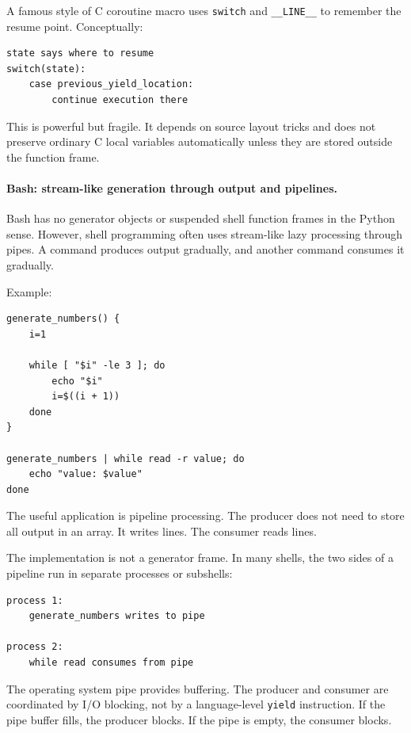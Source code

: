 A famous style of C coroutine macro uses \texttt{switch} and \texttt{\_\_LINE\_\_} to remember the resume point. Conceptually:

\begin{verbatim}
state says where to resume
switch(state):
    case previous_yield_location:
        continue execution there
\end{verbatim}

This is powerful but fragile. It depends on source layout tricks and does not preserve ordinary C local variables automatically unless they are stored outside the function frame.

\paragraph{Bash: stream-like generation through output and pipelines.}

Bash has no generator objects or suspended shell function frames in the Python sense. However, shell programming often uses stream-like lazy processing through pipes. A command produces output gradually, and another command consumes it gradually.

Example:

\begin{verbatim}
generate_numbers() {
    i=1

    while [ "$i" -le 3 ]; do
        echo "$i"
        i=$((i + 1))
    done
}

generate_numbers | while read -r value; do
    echo "value: $value"
done
\end{verbatim}

The useful application is pipeline processing. The producer does not need to store all output in an array. It writes lines. The consumer reads lines.

The implementation is not a generator frame. In many shells, the two sides of a pipeline run in separate processes or subshells:

\begin{verbatim}
process 1:
    generate_numbers writes to pipe

process 2:
    while read consumes from pipe
\end{verbatim}

The operating system pipe provides buffering. The producer and consumer are coordinated by I/O blocking, not by a language-level \texttt{yield} instruction. If the pipe buffer fills, the producer blocks. If the pipe is empty, the consumer blocks.

